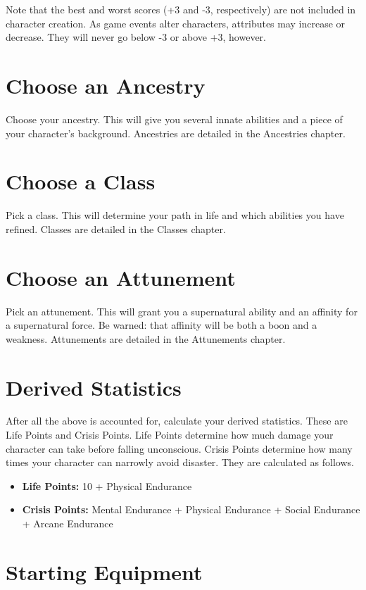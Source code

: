 \begin{multicols}{2}
Note that the best and worst scores (+3 and -3, respectively) are not
included in character creation. As game events alter characters,
attributes may increase or decrease. They will never go below -3 or
above +3, however.

\section{Choose an Ancestry}

Choose your ancestry. This will give you several innate abilities
and a piece of your character's background. Ancestries are detailed
in the Ancestries chapter.

\section{Choose a Class}

Pick a class. This will determine your path in life and which
abilities you have refined. Classes are detailed in the Classes
chapter.

\section{Choose an Attunement}

Pick an attunement. This will grant you a supernatural ability
and an affinity for a supernatural force. Be warned: that
affinity will be both a boon and a weakness. Attunements are
detailed in the Attunements chapter.

\section{Derived Statistics}

After all the above is accounted for, calculate your derived
statistics. These are Life Points and Crisis Points. Life Points
determine how much damage your character can take before falling
unconscious. Crisis Points determine how many times your character
can narrowly avoid disaster. They are calculated as follows.

\begin{itemize}
  \item \textbf{Life Points:} 10 + Physical Endurance
  \item \textbf{Crisis Points:} Mental Endurance + Physical Endurance + Social Endurance + Arcane Endurance
\end{itemize}

\section{Starting Equipment}


\end{multicols}
